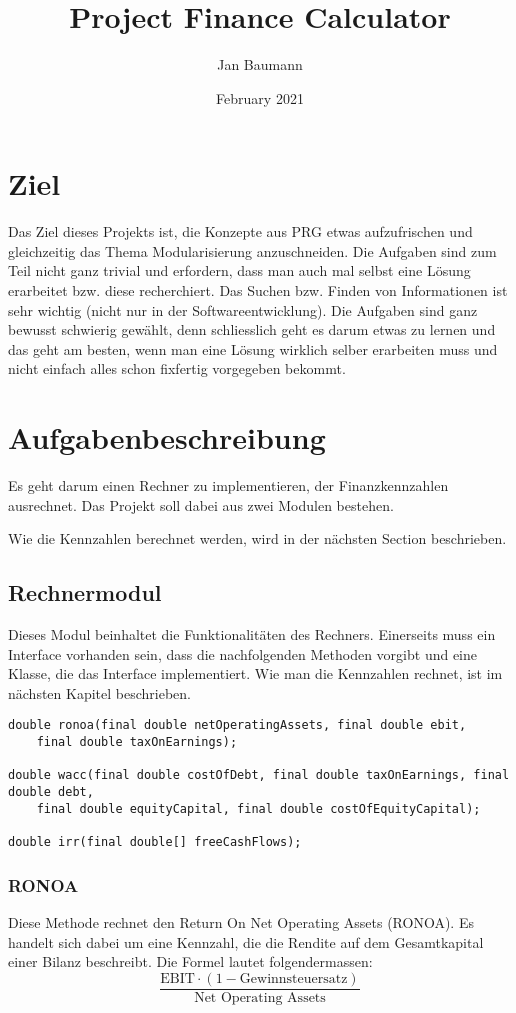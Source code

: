 \documentclass{article}
\title{Project Finance Calculator}
\author{Jan Baumann }
\date{February 2021}
\begin{document}
\maketitle

\section{Ziel}
Das Ziel dieses Projekts ist, die Konzepte aus PRG etwas aufzufrischen und gleichzeitig das Thema Modularisierung anzuschneiden. Die Aufgaben sind zum Teil nicht ganz trivial und erfordern, dass man auch mal selbst eine Lösung erarbeitet bzw. diese recherchiert. Das Suchen bzw. Finden von Informationen ist sehr wichtig (nicht nur in der Softwareentwicklung). Die Aufgaben sind ganz bewusst schwierig gewählt, denn schliesslich geht es darum etwas zu lernen und das geht am besten, wenn man eine Lösung wirklich selber erarbeiten muss und nicht einfach alles schon fixfertig vorgegeben bekommt. 

\section{Aufgabenbeschreibung}
Es geht darum einen Rechner zu implementieren, der Finanzkennzahlen ausrechnet. Das Projekt soll dabei aus zwei Modulen bestehen.

Wie die Kennzahlen berechnet werden, wird in der nächsten Section beschrieben.

\subsection{Rechnermodul}
Dieses Modul beinhaltet die Funktionalitäten des Rechners. Einerseits muss ein Interface vorhanden sein, dass die nachfolgenden Methoden vorgibt und eine Klasse, die das Interface implementiert. Wie man die Kennzahlen rechnet, ist im nächsten Kapitel beschrieben.

\begin{Verbatim}[frame=single]
double ronoa(final double netOperatingAssets, final double ebit, 
    final double taxOnEarnings);

double wacc(final double costOfDebt, final double taxOnEarnings, final double debt, 
    final double equityCapital, final double costOfEquityCapital);

double irr(final double[] freeCashFlows);
\end{Verbatim}

\subsubsection{RONOA}
Diese Methode rechnet den Return On Net Operating Assets (RONOA). Es handelt sich dabei um eine Kennzahl, die die Rendite auf dem Gesamtkapital einer Bilanz beschreibt. Die Formel lautet folgendermassen:
\[\frac{\textrm{EBIT}\cdot(1 - \textrm{Gewinnsteuersatz})}{\textrm{Net Operating Assets}}\]
\end{document}

